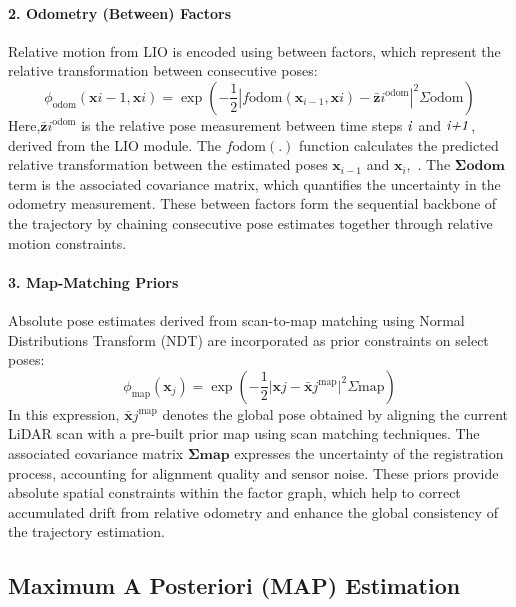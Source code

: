 \paragraph{2. Odometry (Between) Factors}
Relative motion from LIO is encoded using between factors, which represent the relative transformation between consecutive poses:
\begin{equation}
	\phi_{\text{odom}}(\mathbf{x}{i-1}, \mathbf{x}i) = \exp\left( -\frac{1}{2} \left| f{\text{odom}}(\mathbf{x}_{i-1}, \mathbf{x}i) - \bar{\mathbf{z}}i^{\text{odom}} \right|^2{\Sigma{\text{odom}}} \right)
\end{equation}
Here,$\bar{\mathbf{z}}i^{\text{odom}}$ is the relative pose measurement between time steps $\text{\textit{i}}$  and $\text{\textit{i+1}}$, derived from the LIO module. The $f{\text{odom}(\mathbf{.})}$
function  calculates the predicted relative transformation between the estimated poses $\mathbf{x}_{i-1}$ and $\mathbf{x}_{i},$ . The $ \mathbf{\Sigma{\text{odom}}}$ term   is the associated covariance matrix, which quantifies the uncertainty in the odometry measurement. These between factors form the sequential backbone of the trajectory by chaining consecutive pose estimates together through relative motion constraints.

\paragraph{3. Map-Matching Priors}
Absolute pose estimates derived from scan-to-map matching using Normal Distributions Transform (NDT) are incorporated as prior constraints on select poses:
\begin{equation}
	\phi_{\text{map}}(\mathbf{x}_j) = \exp\left( -\frac{1}{2} | \mathbf{x}j - \bar{\mathbf{x}}j^{\text{map}} |^2{\Sigma{\text{map}}} \right)
\end{equation}
In this expression, $\bar{\mathbf{x}}j^{\text{map}} $  denotes the global pose obtained by aligning the current LiDAR scan with a pre-built prior map using scan matching techniques. The associated covariance matrix $\mathbf{\Sigma{\text{map}}}$ expresses the uncertainty of the registration process, accounting for alignment quality and sensor noise. These priors provide absolute spatial constraints within the factor graph, which help to correct accumulated drift from relative odometry and enhance the global consistency of the trajectory estimation.
\subsection{Maximum A Posteriori (MAP) Estimation}

